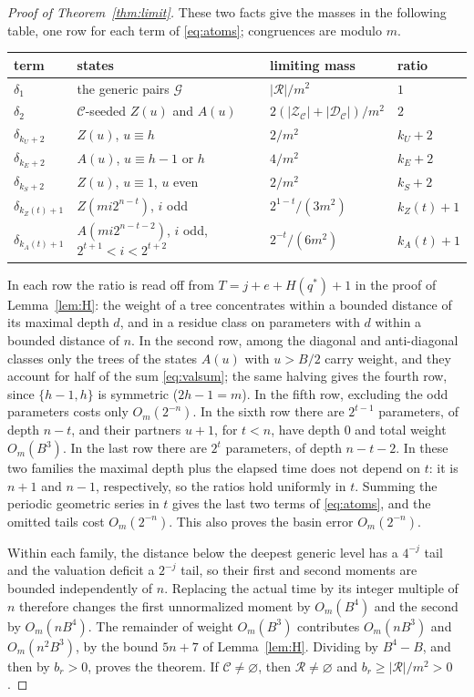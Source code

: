 \documentclass[11pt]{amsart}
\theoremstyle{remark}
\newcommand{\C}{\mathcal{C}}
\newcommand{\R}{\mathcal{R}}
\newcommand{\G}{\mathcal{G}}
\newcommand{\Zs}{\mathcal{Z}}
\newcommand{\Ds}{\mathcal{D}}
\begin{document}
\begin{proof}[Proof of Theorem~\ref{thm:limit}]
These two facts give the masses in the following table, one row for each term of \eqref{eq:atoms}; congruences are modulo $m$.
\begin{center}
\renewcommand{\arraystretch}{1.2}
\begin{tabular}{@{}llll@{}}
\toprule
term & states & limiting mass & ratio\\
\midrule
$\delta_1$ & the generic pairs $\G$ & $|\R|/m^2$ & $1$\\
$\delta_2$ & $\C$-seeded $Z(u)$ and $A(u)$ & $2(|\Zs_\C|+|\Ds_\C|)/m^2$ & $2$\\
$\delta_{k_U+2}$ & $Z(u)$, $u\equiv h$ & $2/m^2$ & $k_U+2$\\
$\delta_{k_E+2}$ & $A(u)$, $u\equiv h-1$ or $h$ & $4/m^2$ & $k_E+2$\\
$\delta_{k_S+2}$ & $Z(u)$, $u\equiv1$, $u$ even & $2/m^2$ & $k_S+2$\\
$\delta_{k_Z(t)+1}$ & $Z(mi2^{n-t})$, $i$ odd & $2^{1-t}/(3m^2)$ & $k_Z(t)+1$\\
$\delta_{k_A(t)+1}$ & $A(mi2^{n-t-2})$, $i$ odd, $2^{t+1}<i<2^{t+2}$ & $2^{-t}/(6m^2)$ & $k_A(t)+1$\\
\bottomrule
\end{tabular}
\end{center}
In each row the ratio is read off from $T=j+e+H(q^*)+1$ in the proof of Lemma~\ref{lem:H}: the weight of a tree concentrates within a bounded distance of its maximal depth $d$, and in a residue class on parameters with $d$ within a bounded distance of $n$. In the second row, among the diagonal and anti-diagonal classes only the trees of the states $A(u)$ with $u>B/2$ carry weight, and they account for half of the sum \eqref{eq:valsum}; the same halving gives the fourth row, since $\{h-1,h\}$ is symmetric ($2h-1=m$). In the fifth row, excluding the odd parameters costs only $O_m(2^{-n})$. In the sixth row there are $2^{t-1}$ parameters, of depth $n-t$, and their partners $u+1$, for $t<n$, have depth $0$ and total weight $O_m(B^3)$. In the last row there are $2^t$ parameters, of depth $n-t-2$. In these two families the maximal depth plus the elapsed time does not depend on $t$: it is $n+1$ and $n-1$, respectively, so the ratios hold uniformly in $t$. Summing the periodic geometric series in $t$ gives the last two terms of \eqref{eq:atoms}, and the omitted tails cost $O_m(2^{-n})$. This also proves the basin error $O_m(2^{-n})$.

Within each family, the distance below the deepest generic level has a $4^{-j}$ tail and the valuation deficit a $2^{-j}$ tail, so their first and second moments are bounded independently of $n$. Replacing the actual time by its integer multiple of $n$ therefore changes the first unnormalized moment by $O_m(B^4)$ and the second by $O_m(nB^4)$. The remainder of weight $O_m(B^3)$ contributes $O_m(nB^3)$ and $O_m(n^2B^3)$, by the bound $5n+7$ of Lemma~\ref{lem:H}. Dividing by $B^4-B$, and then by $b_r>0$, proves the theorem. If $\C\ne\varnothing$, then $\R\ne\varnothing$ and $b_r\ge|\R|/m^2>0$.
\end{proof}
\end{document}
